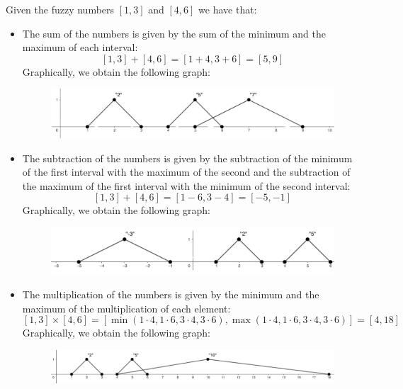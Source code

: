 \documentclass[12pt, a4paper]{report}
\begin{document}
    \begin{example}
        Given the fuzzy numbers $[1,3]$ and $[4,6]$ we have that:
        \begin{itemize}
            \item The sum of the numbers is given by the sum of the minimum and the maximum of each interval:
                \[[1,3]+[4,6]=[1+4,3+6]=[5,9]\]
                Graphically, we obtain the following graph:
                \begin{figure}[H]
                    \centering
                    \includegraphics[width=0.75\linewidth]{images/sum.png}
                \end{figure}
            \item The subtraction of the numbers is given by the subtraction of the minimum of the first interval with the maximum of the 
            second and the subtraction of the maximum of the first interval with the minimum of the second interval:
                \[[1,3]+[4,6]=[1-6,3-4]=[-5,-1]\]
                Graphically, we obtain the following graph:
                \begin{figure}[H]
                    \centering
                    \includegraphics[width=0.75\linewidth]{images/subtraction.png}
                \end{figure}
            \item The multiplication of the numbers is given by the minimum and the maximum of the multiplication of each element:
                \[[1,3] \times [4,6]=[\min(1 \cdot 4, 1 \cdot 6, 3 \cdot 4, 3 \cdot 6),\max(1 \cdot 4, 1 \cdot 6, 3 \cdot 4, 3 \cdot 6)]=[4,18]\]                Graphically, we obtain the following graph:
                \begin{figure}[H]
                    \centering
                    \includegraphics[width=0.75\linewidth]{images/multiplication.png}
                \end{figure}

\end{itemize}
\end{example}
\end{document}
